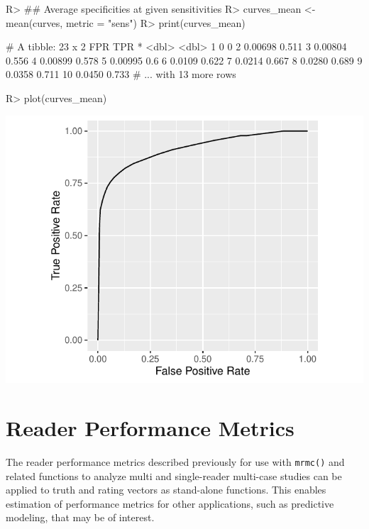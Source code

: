 \documentclass[
]{jss}
\begin{document}
\begin{CodeChunk}
\begin{CodeInput}
R> ## Average specificities at given sensitivities
R> curves_mean <- mean(curves, metric = "sens")
R> print(curves_mean)
\end{CodeInput}
\begin{CodeOutput}
# A tibble: 23 x 2
       FPR   TPR
 *   <dbl> <dbl>
 1 0       0    
 2 0.00698 0.511
 3 0.00804 0.556
 4 0.00899 0.578
 5 0.00995 0.6  
 6 0.0109  0.622
 7 0.0214  0.667
 8 0.0280  0.689
 9 0.0358  0.711
10 0.0450  0.733
# ... with 13 more rows
\end{CodeOutput}
\begin{CodeInput}
R> plot(curves_mean)
\end{CodeInput}


\begin{center}\includegraphics{MRMCaov_files/figure-latex/using_curves_mean_sens-1} \end{center}

\end{CodeChunk}

\hypertarget{reader-performance-metrics}{%
\section{Reader Performance Metrics}\label{reader-performance-metrics}}

The reader performance metrics described previously for use with
\texttt{mrmc()} and related functions to analyze multi and single-reader
multi-case studies can be applied to truth and rating vectors as
stand-alone functions. This enables estimation of performance metrics
for other applications, such as predictive modeling, that may be of
interest.
\end{document}
